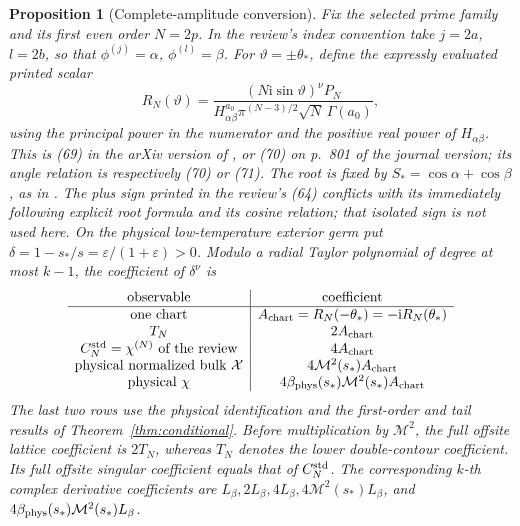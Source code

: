 \documentclass[11pt]{article}
\numberwithin{equation}{section}
\newtheorem{proposition}[theorem]{Proposition}
\theoremstyle{definition}
\newcommand{\ii}{\mathrm i}
\newcommand{\eps}{\varepsilon}
\newcommand{\M}{\mathcal M}
\begin{document}
\begin{proposition}[Complete-amplitude conversion]\label{prop:amplitudecomparison}
Fix the selected prime family and its first even order \(N=2p\).
In the review's index convention take \(j=2a\), \(l=2b\), so that
\(\phi^{(j)}=\alpha\), \(\phi^{(l)}=\beta\).
For \(\vartheta=\pm\theta_*\), define the expressly evaluated
printed scalar
\[
 R_N(\vartheta)=
 \frac{(N\ii\sin\vartheta)^\nu P_N}
 {H_{\alpha\beta}^{a_0}\pi^{(N-3)/2}\sqrt N\,\Gamma(a_0)},
\]
using the principal power in the numerator and the positive real
power of \(H_{\alpha\beta}\). This is (69) in the arXiv version
of \cite{McCoyMaillard2012}, or (70) on p.~801 of the journal
version; its angle relation is respectively (70) or (71).
The root is fixed by \(S_*=\cos\alpha+\cos\beta\), as in
\cite[(3.24)]{Orrick2001}. The plus sign printed in the review's
(64) conflicts with its immediately following explicit root formula
and its cosine relation; that isolated sign is not used here.
On the physical low-temperature exterior germ put
\(\delta=1-s_*/s=\eps/(1+\eps)>0\).
Modulo a radial Taylor polynomial of degree at most \(k-1\), the
coefficient of \(\delta^\nu\) is
\[
 \begin{array}{c|c}
  \text{observable}&\text{coefficient}\\ \hline
  \text{one chart}&A_{\rm chart}=R_N(-\theta_*)=-\ii R_N(\theta_*)\\
  T_N&2A_{\rm chart}\\
  C_N^{\rm std}=\chi^{(N)}\text{ of the review}&4A_{\rm chart}\\
  \text{physical normalized bulk }\mathcal X&4\M^2(s_*)A_{\rm chart}\\
  \text{physical }\chi&4\beta_{\rm phys}(s_*)\M^2(s_*)A_{\rm chart}
 \end{array}
\]
The last two rows use the physical identification and the first-order
and tail results of Theorem~\ref{thm:conditional}. Before multiplication
by \(\M^2\), the full offsite lattice coefficient is \(2T_N\), whereas
\(T_N\) denotes the lower double-contour coefficient. Its full
offsite singular coefficient equals that of \(C_N^{\rm std}\).
The corresponding \(k\)-th complex derivative coefficients are
\(L_\beta,2L_\beta,4L_\beta,4\M^2(s_*)L_\beta\), and
\(4\beta_{\rm phys}(s_*)\M^2(s_*)L_\beta\).
\end{proposition}
\end{document}
